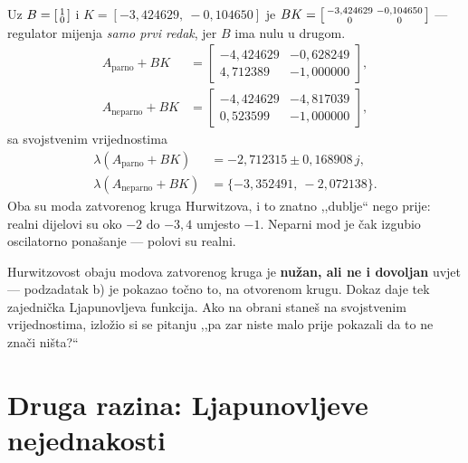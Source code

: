 \begin{korak}
Uz $B = \begin{bsmallmatrix} 1 \\ 0 \end{bsmallmatrix}$ i
$K = [-3{,}424629,\ -0{,}104650]$ je
$BK = \begin{bsmallmatrix} -3{,}424629 & -0{,}104650 \\ 0 & 0 \end{bsmallmatrix}$
--- regulator mijenja \emph{samo prvi redak}, jer $B$ ima nulu u drugom.
\begin{align}
A_{\mathrm{parno}} + BK &= \begin{bmatrix} -4{,}424629 & -0{,}628249 \\ 4{,}712389 & -1{,}000000 \end{bmatrix}, \\
A_{\mathrm{neparno}} + BK &= \begin{bmatrix} -4{,}424629 & -4{,}817039 \\ 0{,}523599 & -1{,}000000 \end{bmatrix},
\end{align}
sa svojstvenim vrijednostima
\begin{align}
\lambda(A_{\mathrm{parno}} + BK) &= -2{,}712315 \pm 0{,}168908\,j, \\
\lambda(A_{\mathrm{neparno}} + BK) &= \{-3{,}352491,\ -2{,}072138\} .
\end{align}
Oba su moda zatvorenog kruga Hurwitzova, i to znatno ,,dublje`` nego prije: realni
dijelovi su oko $-2$ do $-3{,}4$ umjesto $-1$. Neparni mod je čak izgubio
oscilatorno ponašanje --- polovi su realni.
\end{korak}

\begin{zamka}
Hurwitzovost obaju modova zatvorenog kruga je \textbf{nužan, ali ne i dovoljan}
uvjet --- podzadatak b) je pokazao točno to, na otvorenom krugu. Dokaz daje tek
zajednička Ljapunovljeva funkcija. Ako na obrani staneš na svojstvenim
vrijednostima, izložio si se pitanju ,,pa zar niste malo prije pokazali da to ne
znači ništa?``
\end{zamka}

\section{Druga razina: Ljapunovljeve nejednakosti}
\label{sec:z4-provjera-lyap}


